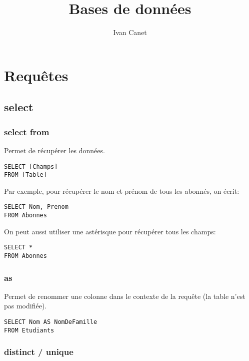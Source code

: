 \documentclass[10pt,a4paper,french]{article}
\begin{document}
\title{Bases de données}
\author{Ivan Canet}
\maketitle


\tableofcontents

\section{Requêtes}

\subsection{\gls{select}}

\subsubsection{\gls{select} \gls{from}}

Permet de récupérer les données.
\begin{verbatim}
SELECT [Champs]
FROM [Table]
\end{verbatim}

Par exemple, pour récupérer le nom et prénom de tous les abonnés, on écrit:
\begin{verbatim}
SELECT Nom, Prenom
FROM Abonnes
\end{verbatim}

On peut aussi utiliser une astérisque pour récupérer tous les champs:
\begin{verbatim}
SELECT *
FROM Abonnes
\end{verbatim}

\subsubsection{\gls{as}}

Permet de renommer une colonne dans le contexte de la requête (la table n'est pas modifiée).
\begin{verbatim}
SELECT Nom AS NomDeFamille
FROM Etudiants
\end{verbatim}

\subsubsection{\gls{distinct} / \gls{unique}}
\end{document}
